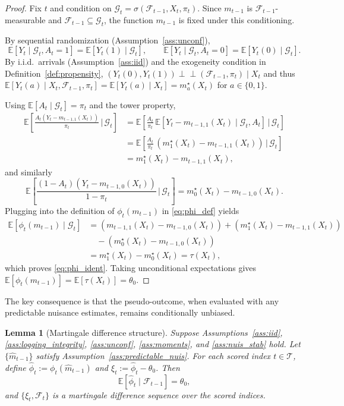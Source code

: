 \documentclass[11pt]{article}
\numberwithin{equation}{section}
\theoremstyle{plain}
\newtheorem{lemma}[theorem]{Lemma}
\theoremstyle{definition}
\theoremstyle{remark}
\newcommand{\E}{\mathbb{E}}
\newcommand{\indep}{\mathrel{\perp\!\!\!\perp}}
\newcommand{\cF}{\mathcal{F}}
\newcommand{\cG}{\mathcal{G}}
\begin{document}
\begin{proof}
Fix $t$ and condition on $\cG_t=\sigma(\cF_{t-1},X_t,\pi_t)$. Since $m_{t-1}$ is
$\cF_{t-1}$-measurable and $\cF_{t-1}\subseteq \cG_t$, the function $m_{t-1}$
is fixed under this conditioning.

By sequential randomization (Assumption~\ref{ass:unconf}),
\[
\E[Y_t \mid \cG_t, A_t=1]=\E[Y_t(1)\mid \cG_t],\qquad
\E[Y_t \mid \cG_t, A_t=0]=\E[Y_t(0)\mid \cG_t].
\]
By i.i.d.\ arrivals (Assumption~\ref{ass:iid}) and the exogeneity condition in Definition~\ref{def:propensity}, $(Y_t(0),Y_t(1))\indep (\cF_{t-1},\pi_t)\mid X_t$ and thus $\E[Y_t(a)\mid X_t,\cF_{t-1},\pi_t]=\E[Y_t(a)\mid X_t]=m_a^\star(X_t)$ for $a\in\{0,1\}$.

Using $\E[A_t\mid \cG_t]=\pi_t$ and the tower property,
\begin{align*}
\E\!\left[\frac{A_t(Y_t-m_{t-1,1}(X_t))}{\pi_t}\,\Big|\,\cG_t\right]
&=
\E\!\left[\frac{A_t}{\pi_t}\,\E[Y_t-m_{t-1,1}(X_t)\mid \cG_t,A_t]\,\Big|\,\cG_t\right]\\
&=
\E\!\left[\frac{A_t}{\pi_t}\,(m_1^\star(X_t)-m_{t-1,1}(X_t))\,\Big|\,\cG_t\right]\\
&= m_1^\star(X_t)-m_{t-1,1}(X_t),
\end{align*}
and similarly
\[
\E\!\left[\frac{(1-A_t)(Y_t-m_{t-1,0}(X_t))}{1-\pi_t}\,\Big|\,\cG_t\right]
= m_0^\star(X_t)-m_{t-1,0}(X_t).
\]
Plugging into the definition of $\phi_t(m_{t-1})$ in \eqref{eq:phi_def} yields
\begin{align*}
\E[\phi_t(m_{t-1})\mid \cG_t]
&= (m_{t-1,1}(X_t)-m_{t-1,0}(X_t))
+(m_1^\star(X_t)-m_{t-1,1}(X_t))\\
&\quad -(m_0^\star(X_t)-m_{t-1,0}(X_t))\\
&= m_1^\star(X_t)-m_0^\star(X_t)
=\tau(X_t),
\end{align*}
which proves \eqref{eq:phi_ident}. Taking unconditional expectations gives
$\E[\phi_t(m_{t-1})]=\E[\tau(X_t)]=\theta_0$.
\end{proof}

The key consequence is that the pseudo-outcome, when evaluated with any predictable nuisance estimates, remains conditionally unbiased.

\begin{lemma}[Martingale difference structure]\label{lem:mds}
Suppose Assumptions~\ref{ass:iid}, \ref{ass:logging_integrity}, \ref{ass:unconf}, \ref{ass:moments}, and \ref{ass:nuis_stab} hold.
Let $\{\widehat m_{t-1}\}$ satisfy Assumption~\ref{ass:predictable_nuis}.
For each scored index $t\in\mathcal{T}$, define $\widehat\phi_t:=\phi_t(\widehat m_{t-1})$ and $\xi_t:=\widehat\phi_t-\theta_0$.
Then
\begin{equation}\label{eq:mds}
\E[\widehat\phi_t \mid \cF_{t-1}] = \theta_0,
\end{equation}
and $\{\xi_t,\cF_t\}$ is a martingale difference sequence over the scored indices.
\end{lemma}
\end{document}
